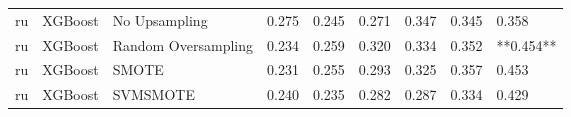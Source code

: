 \begin{tabular}{lllllllll}
      ru &                      XGBoost &       No Upsampling & 0.275 &                     0.245 &                 0.271 &                  0.347 &                                   0.345 &     0.358 \\
      ru &                      XGBoost & Random Oversampling & 0.234 &                     0.259 &                 0.320 &                  0.334 &                                   0.352 & **0.454** \\
      ru &                      XGBoost &               SMOTE & 0.231 &                     0.255 &                 0.293 &                  0.325 &                                   0.357 &     0.453 \\
      ru &                      XGBoost &            SVMSMOTE & 0.240 &                     0.235 &                 0.282 &                  0.287 &                                   0.334 &     0.429 \\
\bottomrule
\end{tabular}
